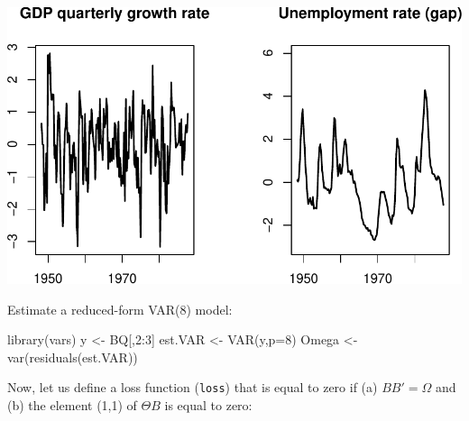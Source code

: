 \documentclass[
  12pt,
]{book}
\newenvironment{Shaded}{\begin{snugshade}}{\end{snugshade}}
\newcommand{\AttributeTok}[1]{\textcolor[rgb]{0.77,0.63,0.00}{#1}}
\newcommand{\DecValTok}[1]{\textcolor[rgb]{0.00,0.00,0.81}{#1}}
\newcommand{\FunctionTok}[1]{\textcolor[rgb]{0.00,0.00,0.00}{#1}}
\newcommand{\NormalTok}[1]{#1}
\newcommand{\OtherTok}[1]{\textcolor[rgb]{0.56,0.35,0.01}{#1}}
\newcommand{\SpecialCharTok}[1]{\textcolor[rgb]{0.00,0.00,0.00}{#1}}
\theoremstyle{definition}
\theoremstyle{definition}
\theoremstyle{definition}
\theoremstyle{definition}
\theoremstyle{remark}
\begin{document}
\includegraphics{IdentifStructShocks_files/figure-latex/BQ1-1.pdf}

Estimate a reduced-form VAR(8) model:

\begin{Shaded}
\begin{Highlighting}[]
\FunctionTok{library}\NormalTok{(vars)}
\NormalTok{y }\OtherTok{\textless{}{-}}\NormalTok{ BQ[,}\DecValTok{2}\SpecialCharTok{:}\DecValTok{3}\NormalTok{]}
\NormalTok{est.VAR }\OtherTok{\textless{}{-}} \FunctionTok{VAR}\NormalTok{(y,}\AttributeTok{p=}\DecValTok{8}\NormalTok{)}
\NormalTok{Omega }\OtherTok{\textless{}{-}} \FunctionTok{var}\NormalTok{(}\FunctionTok{residuals}\NormalTok{(est.VAR))}
\end{Highlighting}
\end{Shaded}

Now, let us define a loss function (\texttt{loss}) that is equal to zero if (a) \(BB'=\Omega\) and (b) the element (1,1) of \(\Theta B\) is equal to zero:
\end{document}

